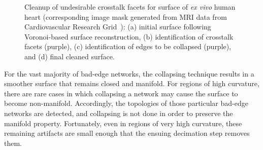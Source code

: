 \begin{figure}[h!]
{\label{fig:cross2-2}}		
%
\caption{Cleanup of undesirable crosstalk facets for surface of \textit{ex vivo} human heart (corresponding image mask generated from MRI data from Cardiovascular Research Grid~\cite{cvgg}): (a) initial surface following Voronoi-based surface reconstruction, (b) identification of crosstalk facets (purple), (c) identification of edges to be collapsed (purple), and (d) final cleaned surface.}
\label{fig:cross2}
\end{figure}

For the vast majority of bad-edge networks, the collapsing technique results in a smoother surface that remains closed and manifold. For regions of high curvature, there are rare cases in which collapsing a network may cause the surface to become non-manifold. Accordingly, the topologies of those particular bad-edge networks are detected, and collapsing is not done in order to preserve the manifold property.  Fortunately, even in regions of very high curvature, these remaining artifacts are small enough that the ensuing decimation step removes them.

